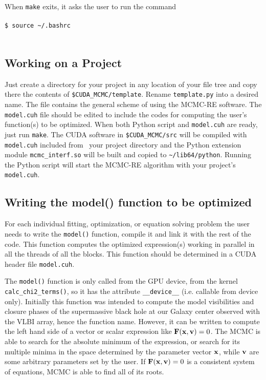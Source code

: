 \documentclass[preprint2]{aastex}
\begin{document}
When \verb|make| exits, it asks the user to run the command \\\\
\verb|$ source ~/.bashrc| \\\\


\subsection{Working on a Project}

Just create a directory for your project in any location of your file tree and
copy there the contents of \verb|$CUDA_MCMC/template|. Rename \verb|template.py|
into a desired name. The file contains the general scheme of using the MCMC-RE
software. The \verb|model.cuh| file should be edited to include the codes for
computing the user's function(s) to be optimized. When both Python script and 
\verb|model.cuh| are ready, just run \verb|make|. The CUDA software in
\verb|$CUDA_MCMC/src| will be compiled with \verb|model.cuh| included from \
your project directory and the Python extension module \verb|mcmc_interf.so|
will be built and copied to \verb|~/lib64/python|. Running the Python script
will start the MCMC-RE algorithm with your project's \verb|model.cuh|. 

\subsection{Writing the model() function to be optimized}

For each individual fitting, optimization, or equation solving problem the user needs to write the \verb|model()| function, compile it and link it with the rest of the code. This function computes the optimized expression(s) working in parallel in all the threads of all the blocks. This function should be determined in a CUDA header file \verb|model.cuh|.

The \verb|model()| function is only called from the GPU device, from the kernel \\
\verb|calc_chi2_terms()|, so it has the attribute \verb|__device__| (i.e. callable from device only). 
Initially this function was intended to compute the model visibilities and closure phases of the supermassive  black hole at our Galaxy center observed with the VLBI array, hence the function name. However, it can be written to compute the left hand side of a vector or scalar expression like ${\bf F}({\bf x}, {\bf v}) = 0$.
The MCMC is able to search for the absolute minimum of the expression, or search for its multiple minima in the space determined by the parameter vector ${\bf x}$, while ${\bf v}$ are some arbitrary parameters set by the user. If ${\bf F}({\bf x}, {\bf v}) = 0$ is a consistent system of equations, MCMC is able to find all of its roots.
\end{document}
